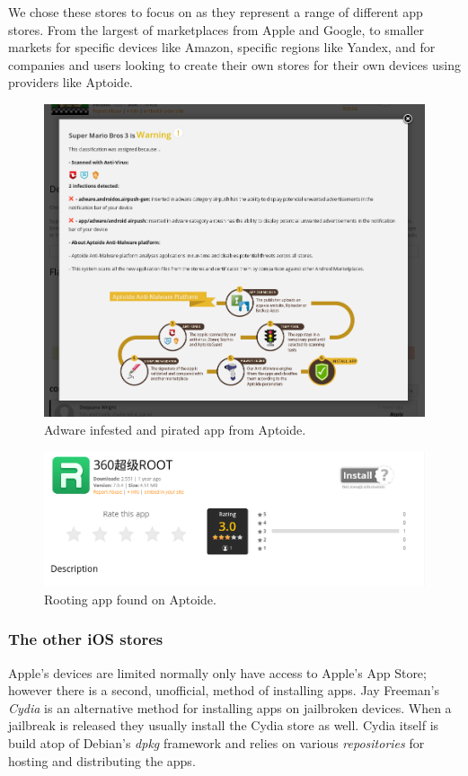 \documentclass[thesis.tex]{subfiles}
\begin{document}
We chose these stores to focus on as they represent a range of
different app stores.  From the largest of marketplaces from Apple and
Google, to smaller markets for specific devices like Amazon, specific
regions like Yandex, and for companies and users looking to create
their own stores for their own devices using providers like Aptoide.

\begin{figure}
  \centering
  \includegraphics[width=0.8\linewidth]{figures/aptoide-malware.png}
  \caption{Adware infested and pirated app from Aptoide.}
  \label{fig:aptoide-malware}
\end{figure}

\begin{figure}
  \centering
  \includegraphics[width=0.8\linewidth]{figures/aptoide-root.png}
  \caption{Rooting app found on Aptoide.}
  \label{fig:aptoide-root}
\end{figure}

\subsubsection{The other iOS stores}

Apple's devices are limited normally only have access to Apple's App Store; however there is a second, unofficial, method of installing apps.
Jay Freeman's \emph{Cydia} is an alternative method for installing apps on jailbroken devices.
When a jailbreak is released they usually install the Cydia store as well.
Cydia itself is build atop of Debian's \emph{dpkg} framework and relies on various \emph{repositories} for hosting and distributing the apps.
\end{document}
